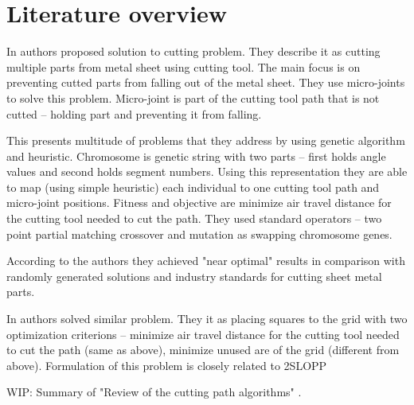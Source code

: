 \section{Literature overview}

In \cite{kandasamyEffectiveLocationMicro2020} authors proposed solution to cutting problem.
They describe it as cutting multiple parts from metal sheet using cutting tool.
The main focus is on preventing cutted parts from falling out of the metal sheet.
They use micro-joints to solve this problem. Micro-joint is part of the cutting tool
path that is not cutted – holding part and preventing it from falling.

This presents multitude of problems that they address by using genetic algorithm
and heuristic. Chromosome is genetic string with two parts – first holds
angle values and second holds segment numbers. Using this representation they are able
to map (using simple heuristic) each individual to one cutting tool path and micro-joint positions.
Fitness and objective are minimize air travel distance for the cutting tool needed to cut the
path. They used standard operators – two point partial matching crossover and mutation
as swapping chromosome genes.

According to the authors they achieved "near optimal" results in comparison with randomly
generated solutions and industry standards for cutting sheet metal parts.

In \cite{vijayanandHeuristicGeneticApproach2015} authors solved similar problem. They it
as placing squares to the grid with two optimization criterions – minimize air travel distance
for the cutting tool needed to cut the path (same as above), minimize unused are of the grid (different from above).
Formulation of this problem is closely related to 2SLOPP\footnotemark

WIP: Summary of "Review of the cutting path algorithms" \cite{dewilReviewCuttingPath2016}.


